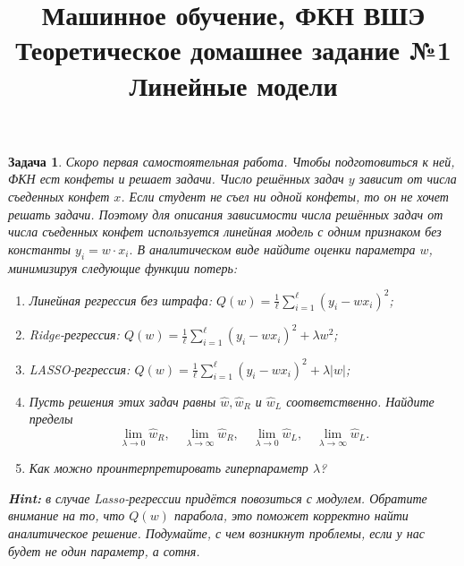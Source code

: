 \documentclass[12pt,fleqn]{article}
\title{Машинное обучение, ФКН ВШЭ \\Теоретическое домашнее задание №1 \\Линейные модели}
\author{}
\date{}
\newtheorem{esProblem}{Задача}
\begin{document}
\maketitle

\begin{esProblem}
Скоро первая самостоятельная работа. Чтобы подготовиться к ней, ФКН ест конфеты и решает задачи. Число решённых задач $y$ зависит от числа съеденных конфет $x$. Если студент не съел ни одной конфеты, то он не хочет решать задачи. Поэтому для описания зависимости числа решённых задач от числа съеденных конфет используется линейная модель с одним признаком без константы $y_i = w \cdot x_i.$ В аналитическом виде найдите оценки параметра $w$, минимизируя следующие функции потерь:

\begin{enumerate}
    \item Линейная регрессия без штрафа: $Q(w) = \frac{1}{\ell} \sum_{i=1}^{\ell} (y_i - w x_i)^2$;
    \item Ridge-регрессия: $Q(w) = \frac{1}{\ell} \sum_{i=1}^{\ell} (y_i - w x_i)^2 + \lambda w^2$;
    \item LASSO-регрессия: $Q(w) = \frac{1}{\ell} \sum_{i=1}^{\ell} (y_i - w x_i)^2 + \lambda |w|$;
    \item Пусть решения этих задач равны $\hat{w}, \hat{w}_R$ и $\hat{w}_L$ соответственно. Найдите пределы 
        \begin{equation*} 
            \lim_{\lambda \to 0}  \hat{w}_R, \quad \lim_{\lambda \to \infty}  \hat{w}_R, \quad \lim_{\lambda \to 0}  \hat{w}_L, \quad \lim_{\lambda \to \infty}  \hat{w}_L.
        \end{equation*} 
    \item Как можно проинтерпретировать гиперпараметр $\lambda$? 
\end{enumerate}

\textbf{Hint:} в случае Lasso-регрессии придётся повозиться с модулем. Обратите внимание на то, что $Q(w)$ парабола, это поможет корректно найти аналитическое решение. Подумайте, с чем возникнут проблемы, если у нас будет не один параметр, а сотня. 
\end{esProblem}
\end{document}
